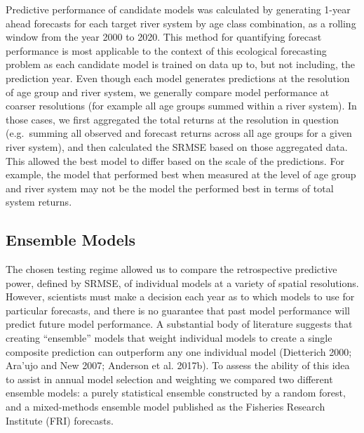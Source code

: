 \documentclass[
]{article}
\begin{document}
Predictive performance of candidate models was calculated by generating 1-year ahead forecasts for each target river system by age class combination, as a rolling window from the year 2000 to 2020. This method for quantifying forecast performance is most applicable to the context of this ecological forecasting problem as each candidate model is trained on data up to, but not including, the prediction year. Even though each model generates predictions at the resolution of age group and river system, we generally compare model performance at coarser resolutions (for example all age groups summed within a river system). In those cases, we first aggregated the total returns at the resolution in question (e.g.~summing all observed and forecast returns across all age groups for a given river system), and then calculated the SRMSE based on those aggregated data. This allowed the best model to differ based on the scale of the predictions. For example, the model that performed best when measured at the level of age group and river system may not be the model the performed best in terms of total system returns.

\hypertarget{ensemble-models}{%
\subsection{Ensemble Models}\label{ensemble-models}}

The chosen testing regime allowed us to compare the retrospective predictive power, defined by SRMSE, of individual models at a variety of spatial resolutions. However, scientists must make a decision each year as to which models to use for particular forecasts, and there is no guarantee that past model performance will predict future model performance. A substantial body of literature suggests that creating ``ensemble'' models that weight individual models to create a single composite prediction can outperform any one individual model (Dietterich 2000; Ara'ujo and New 2007; Anderson et al. 2017b). To assess the ability of this idea to assist in annual model selection and weighting we compared two different ensemble models: a purely statistical ensemble constructed by a random forest, and a mixed-methods ensemble model published as the Fisheries Research Institute (FRI) forecasts.
\end{document}
